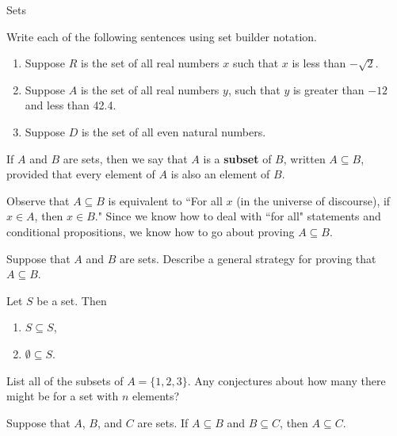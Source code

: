 \begin{section}{Sets}
\begin{exercise}
Write each of the following sentences using set builder notation.
\begin{enumerate}
\item Suppose $R$ is the set of all real numbers $x$ such that $x$ is less than $-\sqrt{2}$. 
\item Suppose $A$ is the set of all real numbers $y$, such that $y$ is greater than $-12$ and less than 42.4.
\item Suppose $D$ is the set of all even natural numbers.
\end{enumerate}
\end{exercise}

\begin{definition}
If $A$ and $B$ are sets, then we say that $A$ is a \textbf{subset} of $B$, written $A\subseteq B$, provided that every element of $A$ is also an element of $B$.
\end{definition}

\begin{remark}
Observe that $A\subseteq B$ is equivalent to ``For all $x$ (in the universe of discourse), if $x\in A$, then $x\in B$."  Since we know how to deal with ``for all" statements and conditional propositions, we know how to go about proving $A\subseteq B$.
\end{remark}

\begin{question}
Suppose that $A$ and $B$ are sets.  Describe a general strategy for proving that $A\subseteq B$.
\end{question}

\begin{theorem}
Let $S$ be a set.  Then
\begin{enumerate}
\item $S\subseteq S$,
\item $\emptyset \subseteq S$.
\end{enumerate}
\end{theorem}

\begin{exercise}
List all of the subsets of $A=\{1,2,3\}$.  Any conjectures about how many there might be for a set with $n$ elements?
\end{exercise}

\begin{theorem}
Suppose that $A$, $B$, and $C$ are sets.  If $A\subseteq B$ and $B\subseteq C$, then $A\subseteq C$.
\end{theorem}


\end{section}
